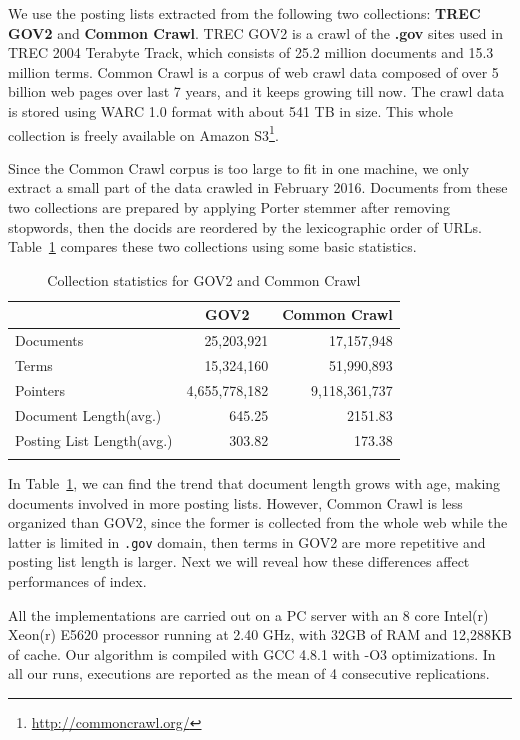 \documentclass{sig-alternate-05-2015}
\begin{document}
We use the posting lists extracted from the following two collections: \textbf{TREC GOV2} and \textbf{Common Crawl}.
TREC GOV2 is a crawl of the \textbf{.gov} sites used in TREC 2004 Terabyte Track, which consists of 25.2 million documents and 15.3 million terms.
Common Crawl is a corpus of web crawl data composed of over 5 billion web pages over last 7 years, and it keeps growing till now.
The crawl data is stored using WARC 1.0 format with about 541 TB in size.
This whole collection is freely available on Amazon S3\footnote{\url{http://commoncrawl.org/}}. 


Since the Common Crawl corpus is too large to fit in one machine, we only extract a small part of the data crawled in February 2016.
Documents from these two collections are prepared by applying Porter stemmer after removing stopwords, then the docids are reordered by the lexicographic order of URLs.
Table~\ref{tab: collection statistics} compares these two collections using some basic statistics.

\begin{table}
	\centering
	\caption{Collection statistics for GOV2 and Common Crawl}
	\renewcommand{\arraystretch}{1.0}
	\setlength\tabcolsep{3pt}
	\begin{tabular}{l*{2}{r}}
		\toprule
		& \multicolumn{1}{c}{GOV2} & \multicolumn{1}{c}{Common Crawl} \\
		\midrule
		Documents & 25,203,921 & 17,157,948 \\
		Terms & 15,324,160 & 51,990,893 \\
		Pointers & 4,655,778,182 & 9,118,361,737 \\
		Document Length(avg.) & 645.25 & 2151.83 \\
		Posting List Length(avg.) & 303.82 & 173.38 \\
		\bottomrule
		\label{tab: collection statistics}
	\end{tabular}
\end{table}

In Table~\ref{tab: collection statistics}, we can find the trend that document length grows with age, making documents involved in more posting lists.
However, Common Crawl is less organized than GOV2, since the former is collected from the whole web while the latter is limited in \texttt{.gov} domain, then terms in GOV2 are more repetitive and posting list length is larger.
Next we will reveal how these differences affect performances of index.

All the implementations are carried out on a PC server with an 8 core Intel(r) Xeon(r) E5620 processor running at 2.40 GHz, with 32GB of RAM and 12,288KB of cache. Our algorithm is compiled with GCC 4.8.1 with -O3 optimizations. In all our runs, executions are reported as the mean of 4 consecutive replications.
\end{document}
